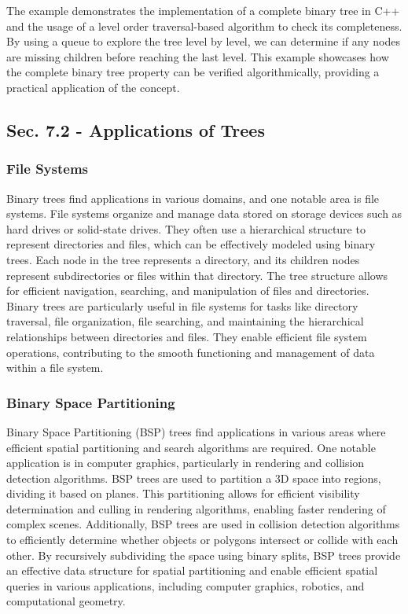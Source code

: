 \begin{solution}
    The example demonstrates the implementation of a complete binary tree in C++ and the usage of a level order traversal-based algorithm to check its completeness. By using a queue to explore the tree level by level, we can determine if any nodes are missing children before reaching the last level. This example showcases how 
    the complete binary tree property can be verified algorithmically, providing a practical application of the concept.
\end{solution}

\subsection*{Sec. 7.2 - Applications of Trees}

\subsubsection{File Systems}

Binary trees find applications in various domains, and one notable area is file systems. File systems organize and manage data stored on storage devices such as hard drives or solid-state drives. They often use a hierarchical structure to represent directories and files, which can be effectively modeled using binary trees. 
Each node in the tree represents a directory, and its children nodes represent subdirectories or files within that directory. The tree structure allows for efficient navigation, searching, and manipulation of files and directories. Binary trees are particularly useful in file systems for tasks like directory traversal, file 
organization, file searching, and maintaining the hierarchical relationships between directories and files. They enable efficient file system operations, contributing to the smooth functioning and management of data within a file system.

\subsubsection{Binary Space Partitioning}

Binary Space Partitioning (BSP) trees find applications in various areas where efficient spatial partitioning and search algorithms are required. One notable application is in computer graphics, particularly in rendering and collision detection algorithms. BSP trees are used to partition a 3D space into regions, 
dividing it based on planes. This partitioning allows for efficient visibility determination and culling in rendering algorithms, enabling faster rendering of complex scenes. Additionally, BSP trees are used in collision detection algorithms to efficiently determine whether objects or polygons intersect or collide 
with each other. By recursively subdividing the space using binary splits, BSP trees provide an effective data structure for spatial partitioning and enable efficient spatial queries in various applications, including computer graphics, robotics, and computational geometry.

